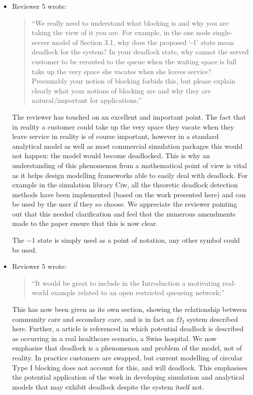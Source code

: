 \documentclass{article}
\begin{document}
\begin{itemize}
\item Reviewer 5 wrote:
\begin{quote}
``We really need to understand what blocking is and why you are taking the
view of it you are.
For example, in the one node single-server model of Section 3.1, why does the
proposed ‘-1’ state mean deadlock for the system?
In your deadlock state, why cannot the served customer to be rerouted to the
queue when the waiting space is full take up the very space she vacates when
she leaves service?
Presumably your notion of blocking forbids this, but please explain clearly
what your notions of blocking are and why they are natural/important for
applications;''
\end{quote}

The reviewer has touched on an excellent and important point.
The fact that in reality a customer could take up the very space they vacate
when they leave service in reality is of course important, however in a
standard analytical model as well as most commercial simulation packages
this would not happen: the model would become deadlocked.
This is why an understanding of this phenomenon from a mathematical point of
view is vital as it helps design modelling frameworks able to easily deal with
deadlock.
For example in the simulation library Ciw, all the theoretic deadlock detection
methods have been implemented (based on the work presented here) and can be used
by the user if they so choose.
We appreciate the reviewer pointing out that this needed clarification and feel
that the numerous amendments made to the paper ensure that this is now clear.

The $-1$ state is simply used as a point of notation, any other symbol could be
used.

\item Reviewer 5 wrote:
\begin{quote}
``It would be great to include in the Introduction a motivating real-world
example related to an open restricted queueing network;''
\end{quote}
This has now been given as its own section, showing the relationship between
community care and secondary care, and is in fact an $\Omega_2$ system
described here.
Further, a article is referenced in which potential deadlock is described as
occurring in a real healthcare scenario, a Swiss hospital.
We now emphasise that deadlock is a phenomenon and problem of the model, not
of reality.
In practice customers are swapped, but current modelling of circular Type I
blocking does not account for this, and will deadlock.
This emphasises the potential application of the work in developing simulation
and analytical models that may exhibit deadlock despite the system itself not.



\end{itemize}
\end{document}
